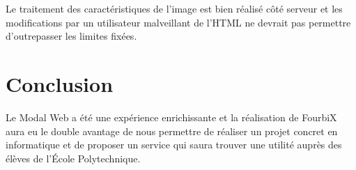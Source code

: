 \documentclass[titlepage,11pt,a4paper]{article}
\begin{document}
Le traitement des caractéristiques de l'image est bien réalisé côté serveur et les modifications par un utilisateur malveillant de l'HTML ne devrait pas permettre d'outrepasser les limites fixées.

\section{Conclusion}

Le Modal Web a été une expérience enrichissante et la réalisation de FourbiX aura eu le double avantage de nous permettre de réaliser un projet concret en informatique et de proposer un service qui saura trouver une utilité auprès des élèves de l'École Polytechnique.
\end{document}
